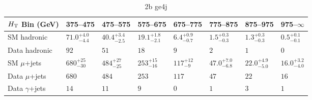 \documentclass[8pt]{article}
\def\scalht{\mbox{$H_{\rm{T}}$}\xspace}
\newcommand\T{\rule{0pt}{2.6ex}}
\newcommand\B{\rule[-1.2ex]{0pt}{0pt}}
\begin{document}
\begin{table}[ht!]
\caption{2b ge4j}
\label{tab:ensemble-2b ge4j}
\centering
\begin{tabular}{ llllllll }

\hline
\scalht Bin (GeV)       & 375--475                       & 475--575                       & 575--675                       & 675--775                       & 775--875                       & 875--975                       & 975--$\infty$                  \\ [1.000000ex]
\hline
SM hadronic\T           & $71.0^{+4.0}_{-4.4}$           & $40.4^{+3.4}_{-2.5}$           & $19.1^{+1.8}_{-2.1}$           & $6.4^{+0.9}_{-0.7}$            & $1.5^{+0.3}_{-0.3}$            & $1.3^{+0.3}_{-0.3}$            & $0.5^{+0.1}_{-0.1}$            \\ 
Data hadronic\B         & $92$                           & $51$                           & $18$                           & $9$                            & $2$                            & $1$                            & $0$                            \\ 
\hline
SM $\mu$+jets\T         & $680^{+25}_{-30}$              & $484^{+27}_{-25}$              & $253^{+15}_{-16}$              & $117^{+12}_{-9}$               & $47.0^{+7.0}_{-6.8}$           & $22.0^{+4.9}_{-5.0}$           & $16.0^{+3.2}_{-4.0}$           \\ 
Data $\mu$+jets\B       & $680$                          & $484$                          & $253$                          & $117$                          & $47$                           & $22$                           & $16$                           \\ 
\hline
Data $\gamma$+jets\B    & $14$                           & $11$                           & $9$                            & $0$                            & $1$                            & $3$                            & $1$                            \\ 
\hline

\end{tabular}
\end{table}
\end{document}
